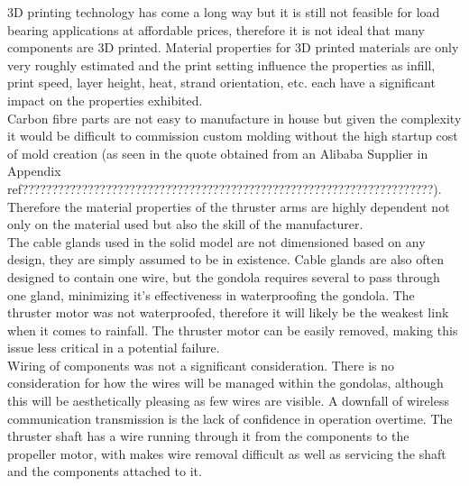 \documentclass[../main.tex]{subfiles}
\begin{document}
3D printing technology has come a long way but it is still not feasible for load bearing applications at affordable prices, therefore it is not ideal that many components are 3D printed. Material properties for 3D printed materials are only very roughly estimated and the print setting influence the properties as infill, print speed, layer height, heat, strand orientation, etc. each have a significant impact on the properties exhibited.
\\
Carbon fibre parts are not easy to manufacture in house but given the complexity it would be difficult to commission custom molding without the high startup cost of mold creation (as seen in the quote obtained from an Alibaba Supplier in Appendix ref{?????????????????????????????????????????????????????????????????????}). Therefore the material properties of the thruster arms are highly dependent not only on the material used but also the skill of the manufacturer.
\\
The cable glands used in the solid model are not dimensioned based on any design, they are simply assumed to be in existence. Cable glands are also often designed to contain one wire, but the gondola requires several to pass through one gland, minimizing it's effectiveness in waterproofing the gondola. The thruster motor was not waterproofed, therefore it will likely be the weakest link when it comes to rainfall. The thruster motor can be easily removed, making this issue less critical in a potential failure. 
\\
Wiring of components was not a significant consideration. There is no consideration for how the wires will be managed within the gondolas, although this will be aesthetically pleasing as few wires are visible. A downfall of wireless communication transmission is the lack of confidence in operation overtime. The thruster shaft has a wire running through it from the components to the propeller motor, with makes wire removal difficult as well as servicing the shaft and the components attached to it.
\\
\end{document}
